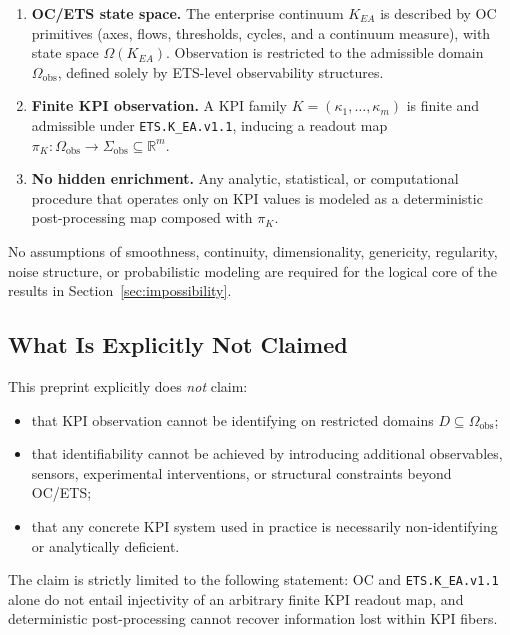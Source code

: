 \begin{enumerate}[leftmargin=2em]
  \item \textbf{OC/ETS state space.}
        The enterprise continuum \(K_{EA}\) is described by OC primitives
        (axes, flows, thresholds, cycles, and a continuum measure), with state
        space \(\Omega(K_{EA})\).
        Observation is restricted to the admissible domain
        \(\Omega_{\mathrm{obs}}\), defined solely by ETS-level observability
        structures.
  \item \textbf{Finite KPI observation.}
        A KPI family \(K=(\kappa_1,\ldots,\kappa_m)\) is finite and admissible
        under \texttt{ETS.K\_EA.v1.1}, inducing a readout map
        \(\pi_K:\Omega_{\mathrm{obs}}\to\Sigma_{\mathrm{obs}}\subseteq\mathbb{R}^m\).
  \item \textbf{No hidden enrichment.}
        Any analytic, statistical, or computational procedure that operates only
        on KPI values is modeled as a deterministic post-processing map composed
        with \(\pi_K\).
\end{enumerate}

No assumptions of smoothness, continuity, dimensionality, genericity,
regularity, noise structure, or probabilistic modeling are required for the
logical core of the results in Section~\ref{sec:impossibility}.

\subsection{What Is Explicitly Not Claimed}

This preprint explicitly does \emph{not} claim:

\begin{itemize}[leftmargin=2em]
  \item that KPI observation cannot be identifying on restricted domains
        \(D\subseteq\Omega_{\mathrm{obs}}\);
  \item that identifiability cannot be achieved by introducing additional
        observables, sensors, experimental interventions, or structural
        constraints beyond OC/ETS;
  \item that any concrete KPI system used in practice is necessarily
        non-identifying or analytically deficient.
\end{itemize}

The claim is strictly limited to the following statement:
OC and \texttt{ETS.K\_EA.v1.1} alone do not entail injectivity of an arbitrary
finite KPI readout map, and deterministic post-processing cannot recover
information lost within KPI fibers.

